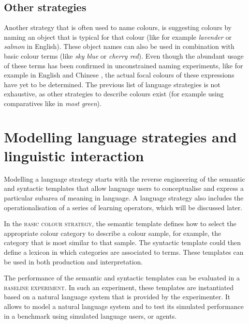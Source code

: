 \subsection{Other strategies}

Another strategy that is often used to name colours, is suggesting
colours by naming an object that is typical for that colour (like for
example \textit{lavender} or \textit{salmon} in English). These object names can
also be used in combination with basic colour terms (like \textit{sky blue}
or \textit{cherry red}). Even though the abundant usage of these terms has
been confirmed in unconstrained naming experiments, like for example
in English and Chinese \citep{lin01unconstrained}, the actual focal
colours of these expressions have yet to be determined. The previous
list of language strategies is not exhaustive, as other strategies to
describe colours exist (for example using comparatives like in \textit{most green}).

\section{Modelling language strategies and linguistic interaction}

Modelling a language strategy starts with the reverse engineering of
the semantic and syntactic templates that allow language users to
conceptualise and express a particular subarea of meaning in
language. A language strategy also includes the operationalisation of
a series of learning operators, which will be discussed later.

In the \textsc{basic colour strategy}, the semantic template defines how
to select the appropriate colour category to describe a colour sample,
for example, the category that is most similar to that sample. The
syntactic template could then define a lexicon in which categories are
associated to terms. These templates can be used in both production
and interpretation.

The performance of the semantic and syntactic templates can be
evaluated in a \textsc{baseline experiment}. 
In such an experiment, these templates are instantiated
based on a natural language system that is provided by the
experimenter. It allows to model a natural language system and to test
its simulated performance in a benchmark using simulated language
users, or agents.

\label{s:intro-language-games}

